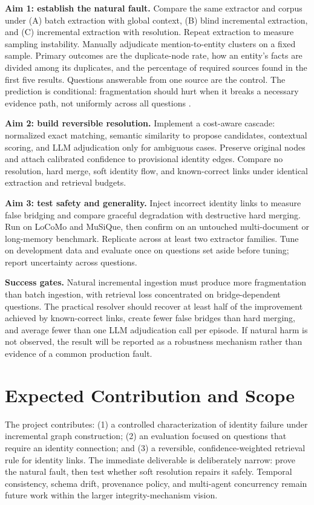 \documentclass[10pt]{article}
\begin{document}
\textbf{Aim 1: establish the natural fault.} Compare the same extractor and corpus
under (A) batch extraction with global context, (B) blind incremental extraction,
and (C) incremental extraction with resolution. Repeat extraction to measure sampling
instability. Manually adjudicate mention-to-entity clusters on a fixed sample. Primary
outcomes are the duplicate-node rate, how an entity's facts are divided among its
duplicates, and the percentage of required sources found in the first five results.
Questions answerable from one source are the control. The prediction is conditional:
fragmentation should hurt when it
breaks a necessary evidence path, not uniformly across all questions
\cite{linkkg,itext2kg,degrag}.

\textbf{Aim 2: build reversible resolution.} Implement a cost-aware cascade:
normalized exact matching, semantic similarity to propose candidates, contextual
scoring, and LLM adjudication only for ambiguous cases. Preserve original nodes and attach calibrated
confidence to provisional identity edges. Compare no resolution, hard merge, soft
identity flow, and known-correct links under identical extraction and retrieval budgets.

\textbf{Aim 3: test safety and generality.} Inject incorrect identity links to measure
false bridging and compare graceful degradation with destructive hard merging. Run on
LoCoMo and MuSiQue, then confirm on an untouched multi-document or long-memory
benchmark. Replicate across at least two extractor families. Tune on development data
and evaluate once on questions set aside before tuning; report uncertainty across
questions.

\textbf{Success gates.} Natural incremental ingestion must produce more fragmentation
than batch ingestion, with retrieval loss concentrated on bridge-dependent questions.
The practical resolver should recover at least half of the improvement achieved by
known-correct links, create fewer false bridges than hard merging, and average fewer than one LLM
adjudication call per episode. If natural harm is not observed, the result will be
reported as a robustness mechanism rather than evidence of a common production fault.

\section{Expected Contribution and Scope}

The project contributes: (1) a controlled characterization of identity failure under
incremental graph construction; (2) an evaluation focused on questions that require
an identity connection; and (3) a reversible, confidence-weighted retrieval rule for
identity links. The immediate deliverable is deliberately narrow: prove the
natural fault, then test whether soft resolution repairs it safely. Temporal
consistency, schema drift, provenance policy, and multi-agent concurrency remain
future work within the larger integrity-mechanism vision.
\end{document}
